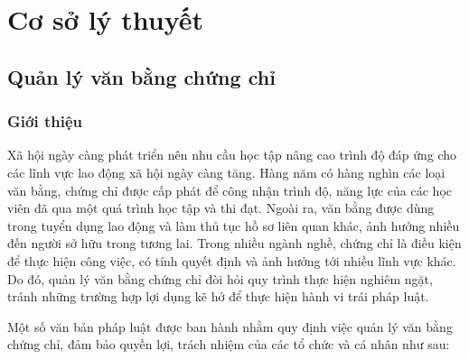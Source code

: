 \chapter{Cơ sở lý thuyết}
\section{Quản lý văn bằng chứng chỉ}
\subsection{Giới thiệu}

Xã hội ngày càng phát triển nên nhu cầu học tập nâng cao trình độ đáp ứng cho các lĩnh vực lao động xã hội ngày càng tăng.
Hàng năm có hàng nghìn các loại văn bằng, chứng chỉ được cấp phát để công nhận trình độ, năng lực của các học viên đã qua một quá trình học tập và thi đạt.
Ngoài ra, văn bằng được dùng trong tuyển dụng lao động và làm thủ tục hồ sơ liên quan khác, ảnh hưởng nhiều đến người sở hữu trong tương lai.
Trong nhiều ngành nghề, chứng chỉ là điều kiện để thực hiện công việc, có tính quyết định và ảnh hưởng tới nhiều lĩnh vực khác.
Do đó, quản lý văn bằng chứng chỉ đòi hỏi quy trình thực hiện nghiêm ngặt, tránh những trường hợp lợi dụng kẽ hở để thực hiện hành vi trái pháp luật.

Một số văn bản pháp luật được ban hành nhằm quy định việc quản lý văn bằng chứng chỉ, đảm bảo quyền lợi, trách nhiệm của các tổ chức và cá nhân như sau:

